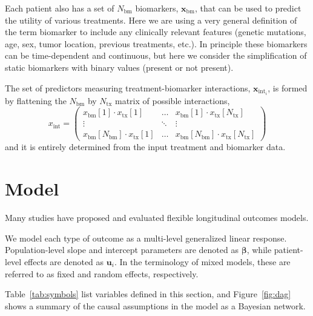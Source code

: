\documentclass[twocolumn]{bmcart}%
\newcommand{\todo}[1]{{\color{red} [\bf{#1}]}}
\def\v#1{\bm{#1}}
\begin{document}
Each patient also has a set of $N_\text{bm}$
biomarkers, $\v x_\text{bm}$,
that can be used to predict the utility of various treatments.  Here we are
using a very general definition of the term biomarker to include any clinically
relevant features (genetic mutations, age, sex, tumor location, previous
treatments, etc.).  In principle these biomarkers can be time-dependent and
continuous, but here we consider the simplification of static biomarkers with
binary values (present or not present).

The set of predictors measuring treatment-biomarker interactions,
$\v x_{\text{int}_i}$,
is formed by flattening the $N_\text{bm}$
by $N_\text{tx}$ matrix of possible interactions,
\begin{equation}
  \label{eq:int}
  x_\text{int} = \begin{pmatrix} 
    x_\text{bm}[1] \cdot x_\text{tx}[1] & \dots & x_\text{bm}[1] \cdot x_\text{tx}[N_\text{tx}] \\
    \vdots & \ddots & \vdots \\
    x_\text{bm}[N_\text{bm}] \cdot x_\text{tx}[1] & \dots & x_\text{bm}[N_\text{bm}] \cdot x_\text{tx}[N_\text{tx}]
        \end{pmatrix}
\end{equation}
and it is entirely determined from the input treatment and biomarker data.

\section{Model}\label{sec:model}

Many studies \citep[e.g.,][\todo{cite, cite}]{adrion2012, hickey2018} have
proposed and evaluated flexible longitudinal outcomes models.

We model each type of outcome as a multi-level generalized linear response.
Population-level slope and intercept parameters are denoted as $\v \beta$,
while patient-level effects are denoted as $\v u_i$.
In the terminology of mixed models, these are referred to as fixed and random
effects, respectively.

Table~\ref{tab:symbols} list variables defined in this section, and
Figure~\ref{fig:dag} shows a summary of the causal assumptions in the model as
a Bayesian network.
\end{document}
